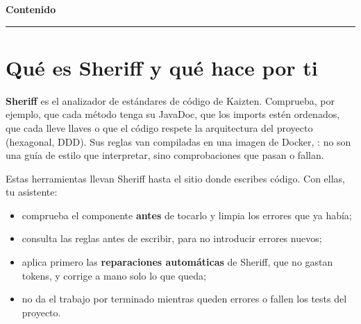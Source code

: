 \documentclass[11pt,a4paper]{article}
\begin{document}
\vspace{0.2\baselineskip}
{\sffamily\bfseries\Large\color{pbbrand}Contenido}\par
\vspace{-0.7\baselineskip}
{\color{pbrule}\rule{\linewidth}{0.8pt}}
\makeatletter{}\makeatother

\clearpage
\section{Qué es Sheriff y qué hace por ti}
\label{sec:que-es}

\textbf{Sheriff} es el analizador de estándares de código de Kaizten. Comprueba,
por ejemplo, que cada método tenga su JavaDoc, que los imports estén ordenados,
que cada  lleve llaves o que el código respete la arquitectura del
proyecto (hexagonal, DDD). Sus reglas van compiladas en una imagen de Docker,
: no son una guía de estilo que interpretar, sino
comprobaciones que pasan o fallan.

Estas herramientas llevan Sheriff hasta el sitio donde escribes código. Con
ellas, tu asistente:

\begin{itemize}
  \item comprueba el componente \textbf{antes} de tocarlo y limpia los errores
        que ya había;
  \item consulta las reglas antes de escribir, para no introducir errores nuevos;
  \item aplica primero las \textbf{reparaciones automáticas} de Sheriff, que no
        gastan tokens, y corrige a mano solo lo que queda;
  \item no da el trabajo por terminado mientras queden errores o fallen los tests
        del proyecto.
\end{itemize}
\end{document}
